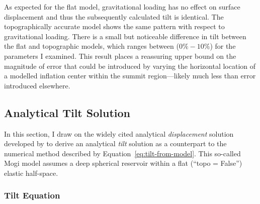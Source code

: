 As expected for the flat model, gravitational loading has no effect on surface displacement and thus the subsequently calculated tilt is identical. The topographically accurate model shows the same pattern with respect to gravitational loading. There is a small but noticeable difference in tilt between the flat and topographic models, which ranges between ($0\%-10\%$) for the parameters I examined. This result places a reassuring upper bound on the magnitude of error that could be introduced by varying the horizontal location of a modelled inflation center within the summit region---likely much less than error introduced elsewhere.

\subsection{Analytical Tilt Solution}

In this section, I draw on the widely cited analytical \emph{displacement} solution developed by \textcite{mogi_relations_1958} to derive an analytical \emph{tilt} solution as a counterpart to the numerical method described by Equation~\eqref{eq:tilt-from-model}. This so-called Mogi model assumes a deep spherical reservoir within a flat (``topo = False'') elastic half-space.

\subsubsection{Tilt Equation}

